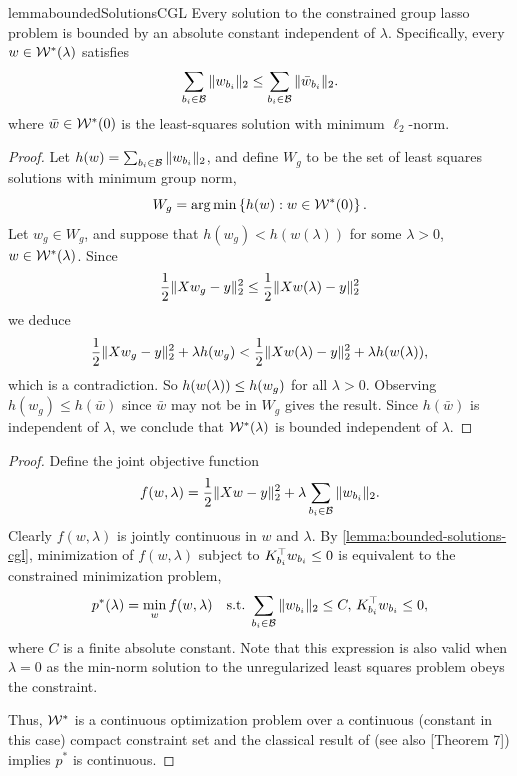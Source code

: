 
\begin{restatable}{lemma}{boundedSolutionsCGL}\label{lemma:bounded-solutions-cgl}
	Every solution to the constrained group lasso problem
	is bounded by an absolute constant independent of \( \lambda \).
	Specifically, every \( w \in \mathcal{W}^*(\lambda) \) satisfies
	\[
		\sum_{{b_i} \in \mathcal{B}} \|w_{b_i}\|_2 \leq \sum_{{b_i} \in \mathcal{B}} \|\bar w_{b_i}\|_2.
	\]
	where \( \bar w \in \mathcal{W}^*(0) \) is the least-squares solution with minimum \( \ell_2 \)-norm.
\end{restatable}
\begin{proof}
	Let \( h(w) = \sum_{{b_i} \in \mathcal{B}} \|w_{b_i}\|_2 \),
	and define \( W_{g} \) to be the set of least squares solutions with
	minimum group norm,
	\[
		W_{g} = \mathop{\rm arg\,min} \left\{h(w) : w \in \mathcal{W}^*(0) \right\}.
	\]
	Let \( w_g \in W_g \),
	and suppose that \( h(w_{g}) < h(w(\lambda)) \)
	for some \( \lambda > 0 \), \( w \in \mathcal{W}^*(\lambda) \).
	Since
	\[
		\frac 1 2 \|X w_g - y\|_2^2
		\leq \frac 1 2 \|X w(\lambda) - y\|_2^2
	\]
	we deduce
	\[
		\frac 1 2 \|X w_g - y\|_2^2 + \lambda h(w_g) <
		\frac 1 2 \|X w(\lambda) - y\|_2^2
		+ \lambda h(w(\lambda)),
	\]
	which is a contradiction.
	So \( h(w(\lambda)) \leq h(w_g) \) for all \( \lambda > 0 \).
	Observing \( h(w_g) \leq h(\bar w) \) since \( \bar w \) may not be in
	\( W_{g} \) gives the result.
	Since \( h(\bar w) \) is independent of \( \lambda \),
	we conclude that \( \mathcal{W}^*(\lambda) \) is bounded independent
	of \( \lambda \).
\end{proof}

\begin{proof}
	Define the joint objective function
	\[
		f(w, \lambda) = \frac 1 2 \|X w - y\|_2^2 + \lambda \sum_{b_i \in \mathcal{B}} \|w_{b_i}\|_2.
	\]
	Clearly \( f(w, \lambda) \) is jointly continuous in \( w \) and \( \lambda \).
	By \cref{lemma:bounded-solutions-cgl}, minimization of
	\( f(w, \lambda) \) subject to \( K_{{b_i}}^\top w_{b_i} \leq 0 \)
	is equivalent to the constrained minimization problem,
	\[
		p^*(\lambda) = \min_{w} f(w, \lambda) \quad \text{s.t.} \; \sum_{{b_i} \in \mathcal{B}} \|w_{b_i}\|_2 \leq C, \, K_{{b_i}}^\top w_{b_i} \leq 0,
	\]
	where \( C \) is a finite absolute constant.
	Note that this expression is also valid when \( \lambda = 0 \) as the
	min-norm solution to the unregularized least squares problem
	obeys the constraint.

	Thus, \( \mathcal{W}^* \) is a continuous optimization problem over a continuous
	(constant in this case)
	compact constraint set and the classical result of \citet{berge1997topological}
	(see also \citet{hogan1973point}[Theorem 7]) implies
	\( p^* \) is continuous.
\end{proof}

